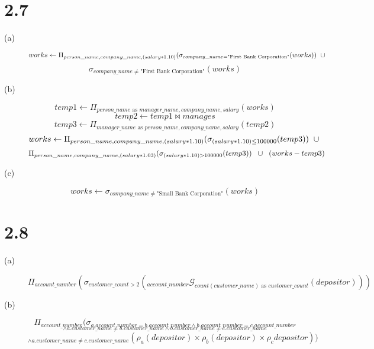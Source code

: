 \documentclass{article}
\begin{document}
\section*{2.7}
\begin{description}
    \item[(a)]
        \[ works \leftarrow \Pi_{person\_name, company\_name, (salary * 1.10)}
                (\sigma_{ company\_name=\text{"First Bank Corporation"}}(works))
                \hspace{2mm} \cup \]
        \[ \sigma_{company\_name \neq \text{"First Bank Corporation"}}(works) \]
    \item[(b)]
        \[ temp1 \leftarrow \Pi_{person\_name \text{ as } manager\_name,
                    company\_name, salary}(works) \]
        \[ temp2 \leftarrow temp1 \bowtie manages \]
        \[ temp3 \leftarrow \Pi_{manager\_name \text{ as } person\_name,
                    company\_name, salary}(temp2) \]
        \[ works \leftarrow \Pi_{person\_name, company\_name, (salary * 1.10)}(
                \sigma_{(salary * 1.10) \leq 100000}(temp3)) \hspace{2mm} \cup \]
        \[ \Pi_{person\_name, company\_name, (salary * 1.03)}(\sigma_{(salary * 1.10)
                > 100000}(temp3)) \hspace{2mm} \cup \hspace{2mm} (works - temp3) \]
    \item[(c)]
        \[ works \leftarrow \sigma_{company\_name \neq \text{"Small Bank
                        Corporation"}}( works) \]
\end{description}
\section*{2.8}
\begin{description}
    \item[(a)]
        \[ \Pi_{account\_number}(\sigma_{customer\_count > 2}(_{account\_number}
            \mathcal{G}_{count(customer\_name) \text{ as } customer\_count}(
            depositor))) \]
    \item[(b)]
        \[ \Pi_{account\_number}(\sigma_{a.account\_number = b.account\_number
                \wedge b.account\_number = c.account\_number} \]
        \[ _{\wedge a.customer\_name \neq b.customer\_name \wedge
                b.customer\_name \neq c.customer\_name} \]
        \[ _{\wedge a.customer\_name \neq c.customer\_name}(\rho_a(depositor)
            \times \rho_b(depositor) \times \rho_c{depositor})) \]

\end{description}
\end{document}
